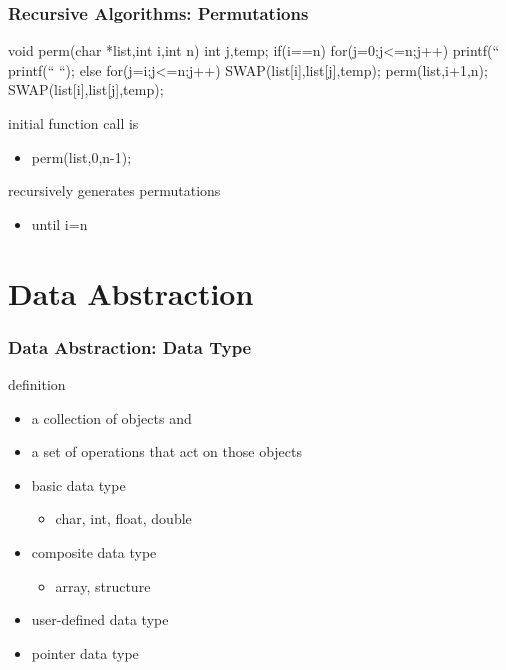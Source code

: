 \documentclass[newPxFont,sthlmFooter,nooffset]{beamer}
\begin{document}
\begin{frame}[t, fragile]
  \frametitle{Recursive Algorithms: Permutations}
\begin{codedef}
void perm(char *list,int i,int n) {
   int j,temp;
   if(i==n) {
      for(j=0;j<=n;j++)
      printf(“%
      printf(“     “);
   }
   else {
      for(j=i;j<=n;j++) {
         SWAP(list[i],list[j],temp);
         perm(list,i+1,n);
         SWAP(list[i],list[j],temp);
       }
   }  
}  
\end{codedef}

initial function call is
\begin{itemize}
\item perm(list,0,n-1);
\end{itemize}

recursively generates permutations
\begin{itemize}
\item until i=n
\end{itemize}

\end{frame}

\section{Data Abstraction}
\begin{frame}[t]
  \frametitle{Data Abstraction: Data Type}
definition
\begin{itemize}
\item a collection of objects and
\item a set of operations that act on
  those objects
\end{itemize}

\begin{itemize}
\item basic data type
  \begin{itemize}
  \item char, int, float, double
  \end{itemize}

\item composite data type
  \begin{itemize}
  \item array, structure
  \end{itemize}
\item user-defined data type
\item pointer data type
\end{itemize}

\end{frame}
\end{document}
